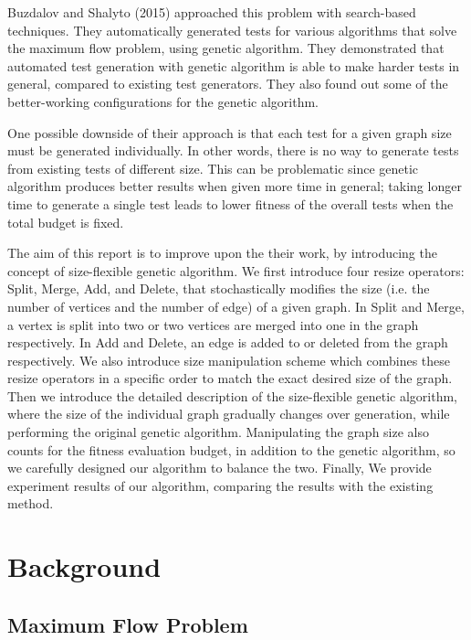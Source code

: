 \documentclass[a4paper, 10pt, conference]{ieeeconf}      %
\begin{document}
Buzdalov and Shalyto (2015) \cite{c1} approached this problem with search-based techniques. They automatically generated tests for various algorithms that solve the maximum flow problem, using genetic algorithm. They demonstrated that automated test generation with genetic algorithm is able to make harder tests in general, compared to existing test generators. They also found out some of the better-working configurations for the genetic algorithm.

One possible downside of their approach is that each test for a given graph size must be generated individually. In other words, there is no way to generate tests from existing tests of different size. This can be problematic since genetic algorithm produces better results when given more time in general; taking longer time to generate a single test leads to lower fitness of the overall tests when the total budget is fixed.

The aim of this report is to improve upon the their work, by introducing the concept of size-flexible genetic algorithm. We first introduce four resize operators: Split, Merge, Add, and Delete, that stochastically modifies the size (i.e. the number of vertices and the number of edge) of a given graph. In Split and Merge, a vertex is split into two or two vertices are merged into one in the graph respectively. In Add and Delete, an edge is added to or deleted from the graph respectively. We also introduce size manipulation scheme which combines these resize operators in a specific order to match the exact desired size of the graph. Then we introduce the detailed description of the size-flexible genetic algorithm, where the size of the individual graph gradually changes over generation, while performing the original genetic algorithm. Manipulating the graph size also counts for the fitness evaluation budget, in addition to the genetic algorithm, so we carefully designed our algorithm to balance the two. Finally, We provide experiment results of our algorithm, comparing the results with the existing method.


\section{Background}

\subsection{Maximum Flow Problem}
\end{document}
